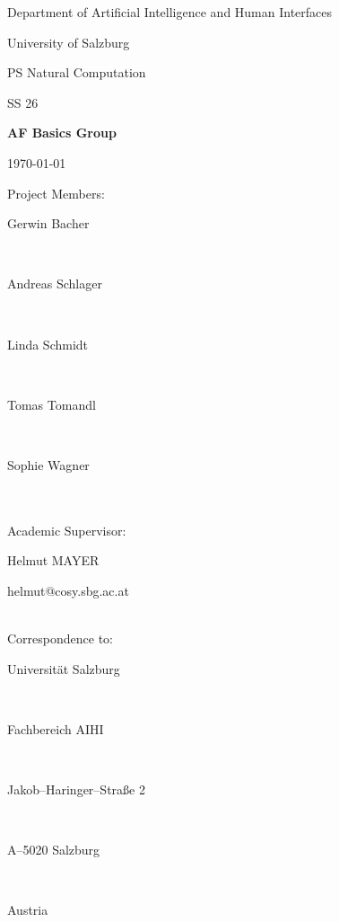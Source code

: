 \documentclass[12pt,fleqn,a4paper]{article}
\begin{document}
\begin{titlepage}%
\vspace{2cm}
\centerline{
\large{Department of Artificial Intelligence and Human Interfaces}}
\vspace{0.2cm}
\centerline{\large{University of Salzburg}}%
\vspace{2cm}

\centerline{\large{PS Natural Computation}}
\centerline{SS 26}
\vspace{1cm}

\centerline{\Large{\bf{AF Basics Group}} }%
\vspace{1cm}

\vspace{0.4cm}%
\centerline{\today}
\vspace{5cm}%

\vspace{0.2cm}
Project Members:\\
\centerline{Gerwin Bacher}\\
\centerline{Andreas Schlager}\\
\centerline{Linda Schmidt}\\
\centerline{Tomas Tomandl}\\
\centerline{Sophie Wagner}\\
\vspace {1cm}\\

Academic Supervisor: \\
\centerline{Helmut MAYER}
\centerline{helmut@cosy.sbg.ac.at}
\vspace{1.5cm}\\
Correspondence to: \\
\centerline{Universit\"{a}t Salzburg} \\
\centerline{Fachbereich AIHI} \\
\centerline{Jakob--Haringer--Stra\ss e 2} \\
\centerline{A--5020 Salzburg} \\
\centerline{Austria}
\clearpage
\end{titlepage}


\clearpage
\pagestyle{headings}
\setcounter{page}{1}
\setcounter{page}{1}
\end{document}
